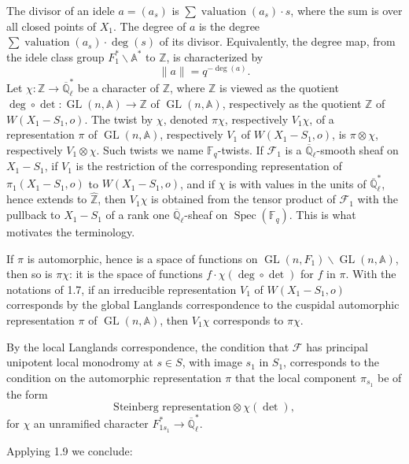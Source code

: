 \documentclass[10pt]{article}
\newcommand{\Fq}{\mathbb F_q}
\newcommand{\Ql}{\overline{\mathbb Q}_{\ell}}
\newcommand{\Adele}{\mathbb A}
\newcommand{\GL}{\operatorname{GL}}
\newcommand{\Zhat}{\widehat{\mathbb Z}}
\newcommand{\val}{\operatorname{valuation}}
\newcommand{\Spec}{\operatorname{Spec}}
\newcommand{\degm}{\operatorname{deg}}
\newcommand{\detm}{\operatorname{det}}
\theoremstyle{deligne}
\newcommand{\heading}[1]{\vspace{0.7em}\noindent{\bfseries #1}\quad}
\begin{document}
\heading{1.10.} The divisor of an idele $a=(a_s)$ is $\sum \val(a_s)\cdot s$, where the sum is over all closed points of $X_1$. The degree of $a$ is the degree $\sum \val(a_s)\cdot\deg(s)$ of its divisor. Equivalently, the degree map, from the idele class group $F_1^*\backslash \Adele^*$ to $\mathbb Z$, is characterized by
\begin{equation}\tag{1.10.1}
 \|a\|=q^{-\degm(a)}.
\end{equation}
Let $\chi:\mathbb Z\to\Ql^*$ be a character of $\mathbb Z$, where $\mathbb Z$ is viewed as the quotient $\degm\circ\detm:\GL(n,\Adele)\to\mathbb Z$ of $\GL(n,\Adele)$, respectively as the quotient $\mathbb Z$ of $W(X_1-S_1,o)$. The twist by $\chi$, denoted $\pi\chi$, respectively $V_1\chi$, of a representation $\pi$ of $\GL(n,\Adele)$, respectively $V_1$ of $W(X_1-S_1,o)$, is $\pi\otimes\chi$, respectively $V_1\otimes\chi$. Such twists we name $\Fq$-twists. If $\mathcal F_1$ is a $\Ql$-smooth sheaf on $X_1-S_1$, if $V_1$ is the restriction of the corresponding representation of $\pi_1(X_1-S_1,o)$ to $W(X_1-S_1,o)$, and if $\chi$ is with values in the units of $\Ql^*$, hence extends to $\Zhat$, then $V_1\chi$ is obtained from the tensor product of $\mathcal F_1$ with the pullback to $X_1-S_1$ of a rank one $\Ql$-sheaf on $\Spec(\Fq)$. This is what motivates the terminology.

If $\pi$ is automorphic, hence is a space of functions on $\GL(n,F_1)\backslash\GL(n,\Adele)$, then so is $\pi\chi$: it is the space of functions $f\cdot\chi(\degm\circ\detm)$ for $f$ in $\pi$. With the notations of 1.7, if an irreducible representation $V_1$ of $W(X_1-S_1,o)$ corresponds by the global Langlands correspondence to the cuspidal automorphic representation $\pi$ of $\GL(n,\Adele)$, then $V_1\chi$ corresponds to $\pi\chi$.

By the local Langlands correspondence, the condition that $\mathcal F$ has principal unipotent local monodromy at $s\in S$, with image $s_1$ in $S_1$, corresponds to the condition on the automorphic representation $\pi$ that the local component $\pi_{s_1}$ be of the form
\begin{equation}\tag{1.10.2}
 \text{Steinberg representation}\otimes \chi(\detm),
\end{equation}
for $\chi$ an unramified character $F_{1s_1}^*\to\Ql^*$.

Applying 1.9 we conclude:
\end{document}
